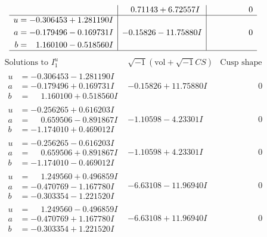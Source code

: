 \documentclass[1p]{elsarticle_modified}
\theoremstyle{definition}
\newcommand{\I}{\sqrt{-1}}
\begin{document}
$$\begin{array}{c|c|c}
 & \phantom{-}0.71143 + 6.72557 I & \phantom{-0.000000 } 0 \\ \hline\begin{aligned}
u &= -0.306453 + 1.281190 I \\
a &= -0.179496 - 0.169731 I \\
b &= \phantom{-}1.160100 - 0.518560 I\end{aligned}
 & -0.15826 - 11.75880 I & \phantom{-0.000000 } 0\\
 \hline 
 \end{array}$$\newpage$$\begin{array}{c|c|c}  
\text{Solutions to }I^u_{1}& \I (\text{vol} + \sqrt{-1}CS) & \text{Cusp shape}\\
 \hline 
\begin{aligned}
u &= -0.306453 - 1.281190 I \\
a &= -0.179496 + 0.169731 I \\
b &= \phantom{-}1.160100 + 0.518560 I\end{aligned}
 & -0.15826 + 11.75880 I & \phantom{-0.000000 } 0 \\ \hline\begin{aligned}
u &= -0.256265 + 0.616203 I \\
a &= \phantom{-}0.659506 - 0.891867 I \\
b &= -1.174010 + 0.469012 I\end{aligned}
 & -1.10598 - 4.23301 I & \phantom{-0.000000 } 0 \\ \hline\begin{aligned}
u &= -0.256265 - 0.616203 I \\
a &= \phantom{-}0.659506 + 0.891867 I \\
b &= -1.174010 - 0.469012 I\end{aligned}
 & -1.10598 + 4.23301 I & \phantom{-0.000000 } 0 \\ \hline\begin{aligned}
u &= \phantom{-}1.249560 + 0.496859 I \\
a &= -0.470769 - 1.167780 I \\
b &= -0.303354 - 1.221520 I\end{aligned}
 & -6.63108 - 11.96940 I & \phantom{-0.000000 } 0 \\ \hline\begin{aligned}
u &= \phantom{-}1.249560 - 0.496859 I \\
a &= -0.470769 + 1.167780 I \\
b &= -0.303354 + 1.221520 I\end{aligned}
 & -6.63108 + 11.96940 I & \phantom{-0.000000 } 0 \\ \hline\begin{aligned}

\end{aligned}
\end{array}$$
\end{document}
